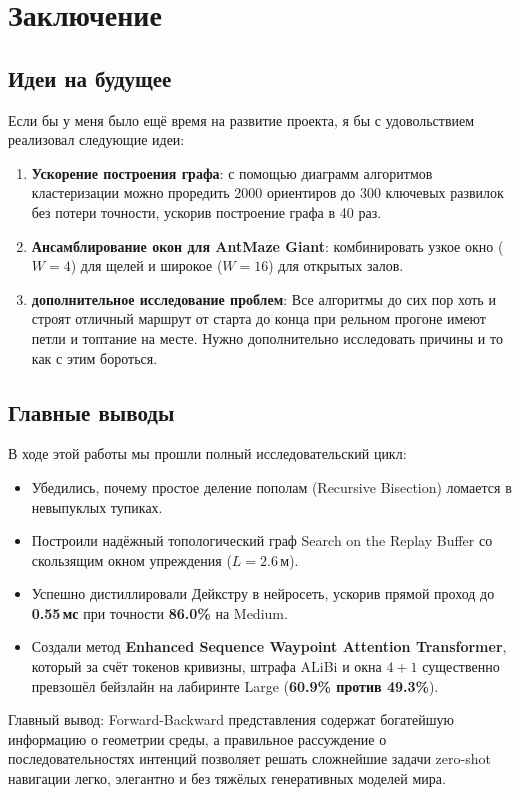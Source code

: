 \section{Заключение}

\subsection{Идеи на будущее}

Если бы у меня было ещё время на развитие проекта, я бы с удовольствием реализовал следующие идеи:
\begin{enumerate}[leftmargin=*,noitemsep]
    \item \textbf{Ускорение построения графа}: с помощью диаграмм алгоритмов кластеризации можно проредить 2000 ориентиров до 300 ключевых развилок без потери точности, ускорив построение графа в 40 раз.
    \item \textbf{Ансамблирование окон для AntMaze Giant}: комбинировать узкое окно ($W=4$) для щелей и широкое ($W=16$) для открытых залов.
    \item \textbf{дополнительное исследование проблем}: Все алгоритмы до сих пор хоть и строят отличный маршрут от старта до конца при рельном прогоне имеют петли и топтание на месте. Нужно дополнительно исследовать причины и то как с этим бороться.
\end{enumerate}

\subsection{Главные выводы}

В ходе этой работы мы прошли полный исследовательский цикл:
\begin{itemize}[leftmargin=*,noitemsep]
    \item Убедились, почему простое деление пополам (Recursive Bisection) ломается в невыпуклых тупиках.
    \item Построили надёжный топологический граф Search on the Replay Buffer со скользящим окном упреждения ($L=2.6\,\text{м}$).
    \item Успешно дистиллировали Дейкстру в нейросеть, ускорив прямой проход до \textbf{0.55\,мс} при точности \textbf{86.0\%} на Medium.
    \item Создали метод \textbf{Enhanced Sequence Waypoint Attention Transformer}, который за счёт токенов кривизны, штрафа ALiBi и окна $4+1$ существенно превзошёл бейзлайн на лабиринте Large (\textbf{60.9\% против 49.3\%}).
\end{itemize}

Главный вывод: Forward-Backward представления содержат богатейшую информацию о геометрии среды, а правильное рассуждение о последовательностях интенций позволяет решать сложнейшие задачи zero-shot навигации легко, элегантно и без тяжёлых генеративных моделей мира.
